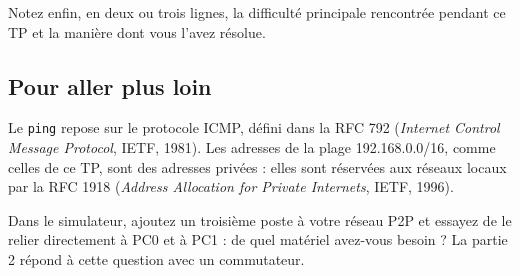 \documentclass[
  french,
  10pt,
  a4paper,
]{scrartcl}
\begin{document}
Notez enfin, en deux ou trois lignes, la difficulté principale
rencontrée pendant ce TP et la manière dont vous l'avez résolue.

\subsection{Pour aller plus loin}\label{pour-aller-plus-loin}

Le \texttt{ping} repose sur le protocole ICMP, défini dans la RFC 792
(\emph{Internet Control Message Protocol}, IETF, 1981). Les adresses de
la plage 192.168.0.0/16, comme celles de ce TP, sont des adresses
privées : elles sont réservées aux réseaux locaux par la RFC 1918
(\emph{Address Allocation for Private Internets}, IETF, 1996).

Dans le simulateur, ajoutez un troisième poste à votre réseau P2P et
essayez de le relier directement à PC0 et à PC1 : de quel matériel
avez-vous besoin ? La partie 2 répond à cette question avec un
commutateur.
\end{document}
